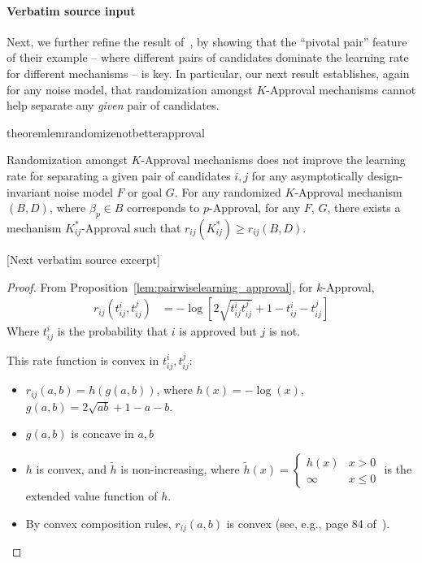 \documentclass[10pt]{article}
\begin{document}
\paragraph{Verbatim source input}
\begin{ReviewVerbatim}
Next, we further refine the result of~\citet{caragiannis_learning_2017}, by showing that the ``pivotal pair'' feature of their example -- where different pairs of candidates dominate the learning rate for different mechanisms -- is key. In particular, our next result establishes, again for any noise model, that randomization amongst $K$-Approval mechanisms cannot help separate any \textit{given} pair of candidates.


%


\begin{restatable}{theorem}{lemrandomizenotbetterapproval}
	\label{lem:randomizenotbetterapproval}

		Randomization amongst $K$-Approval mechanisms does not improve the learning rate for separating a given pair of candidates $i,j$ for any asymptotically design-invariant noise model $F$ or goal $G$. For any randomized $K$-Approval mechanism $(B,D)$, where $\beta_p\in B$ corresponds to $p$-Approval, for any $F$, $G$, there exists a mechanism $K_{ij}^*$-Approval such that $r_{ij}(K_{ij}^*) \geq r_{ij}(B,D)$.


%


%

%
%
%
\end{restatable}

[Next verbatim source excerpt]

\lemrandomizenotbetterapproval*
\begin{proof}
	From Proposition~\ref{lem:pairwiselearning_approval}, for $k$-Approval,
	\begin{align*}
		r_{ij}(t^i_{ij}, t^j_{ij}) &= -\log\left[ 2\sqrt{t_{ij}^it_{ij}^j} + 1 - t_{ij}^i - t_{ij}^j \right]
	\end{align*}
	Where $t^i_{ij}$ is the probability that $i$ is approved but $j$ is not.

	This rate function is convex in $t^i_{ij}, t^j_{ij}$:
	\begin{itemize}
		\item $r_{ij}(a,b) = h(g(a, b))$, where $h(x) = -\log(x)$, $g(a, b) = 2\sqrt{ab} + 1 - a - b$.
		\item $g(a, b)$ is concave in $a, b$
		\item $h$ is convex, and $\tilde{h}$ is non-increasing, where $\tilde{h}(x) =  \begin{cases} h(x) & x > 0 \\ \infty & x \leq 0 \end{cases}$ is the extended value function of $h$.
		\item By convex composition rules, $r_{ij}(a,b)$ is convex (see, e.g., page 84 of~\citet{boyd_convex_2004}).
	\end{itemize}


\end{proof}
\end{ReviewVerbatim}
\end{document}
